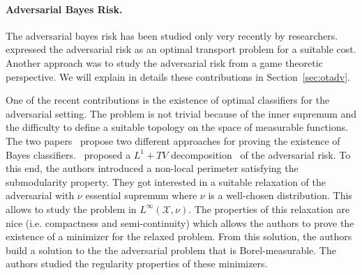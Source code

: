 \paragraph{Adversarial Bayes Risk.} The adversarial bayes risk has been studied only very recently by researchers.~\cite{bhagoji2019lower,pydi2019adversarial,trillos2020adversarial} expressed the adversarial risk as an optimal transport problem for a suitable cost. Another approach was to study the adversarial risk from a game theoretic perspective. We will explain in details these contributions in Section~\ref{sec:otadv}. 


One of the recent contributions is the existence of  optimal classifiers for the adversarial setting.  The problem is not trivial because of the inner supremum and the difficulty to define a suitable topology on the space of measurable functions. The two papers~\citep{awasthi2021existence,bungert2021geometry} propose two different approaches for proving the existence of Bayes classifiers.~\cite{bungert2021geometry} proposed a $L^1+TV$ decomposition~\citep{chan2005aspects} of the adversarial risk.  To this end, the authors introduced a non-local perimeter satisfying the submodularity property. They got interested in a suitable relaxation of the adversarial with $\nu$ essential supremum where $\nu$ is a well-chosen distribution. This allows to study the problem in $L^\infty(\mathcal{X},\nu)$. The properties of this relaxation are nice (i.e. compactness and semi-continuity) which allows the authors to prove the existence of a minimizer for the relaxed problem. From this solution, the authors build a solution to the the adversarial problem that is Borel-measurable. The authors studied the regularity properties of these minimizers.

 